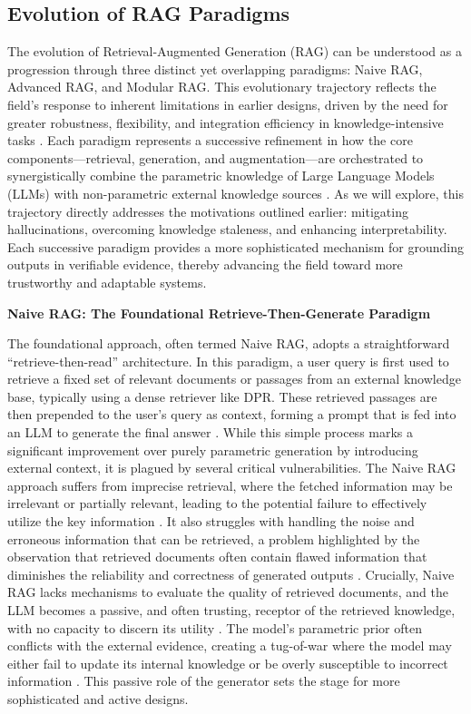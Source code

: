 \documentclass[11pt]{article}
\begin{document}
\subsection{Evolution of RAG Paradigms}

The evolution of Retrieval-Augmented Generation (RAG) can be understood as a progression through three distinct yet overlapping paradigms: Naive RAG, Advanced RAG, and Modular RAG. This evolutionary trajectory reflects the field's response to inherent limitations in earlier designs, driven by the need for greater robustness, flexibility, and integration efficiency in knowledge-intensive tasks \cite{ref23}. Each paradigm represents a successive refinement in how the core components---retrieval, generation, and augmentation---are orchestrated to synergistically combine the parametric knowledge of Large Language Models (LLMs) with non-parametric external knowledge sources \cite{ref23}. As we will explore, this trajectory directly addresses the motivations outlined earlier: mitigating hallucinations, overcoming knowledge staleness, and enhancing interpretability. Each successive paradigm provides a more sophisticated mechanism for grounding outputs in verifiable evidence, thereby advancing the field toward more trustworthy and adaptable systems.

\textbf{Naive RAG: The Foundational Retrieve-Then-Generate Paradigm}

The foundational approach, often termed Naive RAG, adopts a straightforward ``retrieve-then-read'' architecture. In this paradigm, a user query is first used to retrieve a fixed set of relevant documents or passages from an external knowledge base, typically using a dense retriever like DPR. These retrieved passages are then prepended to the user's query as context, forming a prompt that is fed into an LLM to generate the final answer \cite{ref23}. While this simple process marks a significant improvement over purely parametric generation by introducing external context, it is plagued by several critical vulnerabilities. The Naive RAG approach suffers from imprecise retrieval, where the fetched information may be irrelevant or partially relevant, leading to the potential failure to effectively utilize the key information \cite{ref34}. It also struggles with handling the noise and erroneous information that can be retrieved, a problem highlighted by the observation that retrieved documents often contain flawed information that diminishes the reliability and correctness of generated outputs \cite{ref35}. Crucially, Naive RAG lacks mechanisms to evaluate the quality of retrieved documents, and the LLM becomes a passive, and often trusting, receptor of the retrieved knowledge, with no capacity to discern its utility \cite{ref36}. The model's parametric prior often conflicts with the external evidence, creating a tug-of-war where the model may either fail to update its internal knowledge or be overly susceptible to incorrect information \cite{ref37}. This passive role of the generator sets the stage for more sophisticated and active designs.
\end{document}

